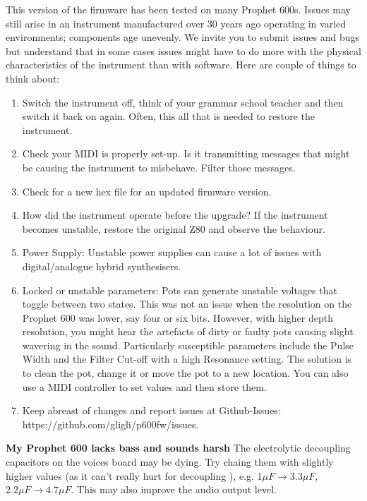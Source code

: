This version of the firmware has been tested on many Prophet 600s.  Issues may still arise in an instrument manufactured over 30 years ago operating in varied environments; components age unevenly.  We invite you to submit issues and bugs but understand that in some cases issues might have to do more with the physical characteristics of the instrument than with software.  Here are couple of things to think about:

\begin{enumerate}
  \setlength\itemsep{0cm}
  \item Switch the instrument off, think of your grammar school teacher and then switch it back on again. Often, this all that is needed to restore the instrument. 
  \item Check your MIDI is properly set-up.  Is it transmitting messages that might be causing the instrument to misbehave.  Filter those messages.
  \item Check for a new hex file for an updated firmware version.
  \item How did the instrument operate before the upgrade?  If the instrument becomes unstable, restore the original Z80 and observe the behaviour.
  \item Power Supply: Unstable power supplies can cause a lot of issues with digital/analogue hybrid synthesisers.
  \item Locked or unstable parameters: Pots can generate unstable voltages that toggle between two states.  This was not an issue when the resolution on the Prophet 600 was lower, say four or six bits.  However, with higher depth resolution, you might hear the artefacts of dirty or faulty pots causing slight wavering in the sound.  Particularly susceptible parameters include the Pulse Width and the Filter Cut-off with a high Resonance setting.  The solution is to clean the pot, change it or move the pot to a new location.  You can also use a MIDI controller to set values and then store them.   
  \item Keep abreast of changes and report issues at Github-Issues: https://github.com/gligli/p600fw/issues. 
    
\end{enumerate}

\textbf{My Prophet 600 lacks bass and sounds harsh}
The electrolytic decoupling capacitors on the voices board may be dying. Try chaing them with slightly higher values (as it can't really hurt for decoupling ), 
e.g. $1\mu F \to 3.3\mu F$, $2.2\mu F \to 4.7\mu F$. This may also improve the audio output level.
